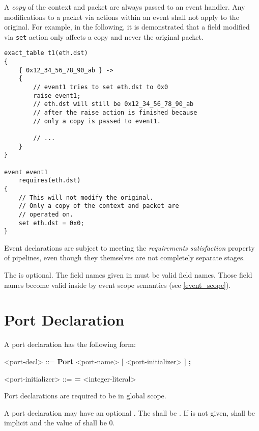 A \textit{copy} of the context  and packet are always passed to an event handler. Any modifications to a packet via actions within an event shall not apply to the original. For example, in the following, it is demonstrated that a field modified via \texttt{set} action only affects a copy and never the original packet.

\begin{minip}
\begin{lstlisting}
exact_table t1(eth.dst)
{
	{ 0x12_34_56_78_90_ab } ->
	{
		// event1 tries to set eth.dst to 0x0
		raise event1;
		// eth.dst will still be 0x12_34_56_78_90_ab
		// after the raise action is finished because
		// only a copy is passed to event1.
		
		// ...
	}
}

event event1
	requires(eth.dst)
{
	// This will not modify the original.
	// Only a copy of the context and packet are
	// operated on.
	set eth.dst = 0x0;
}
\end{lstlisting}
\end{minip}

Event declarations are subject to meeting the \textit{requirements satisfaction} property of pipelines, even though they themselves are not completely separate stages.

The  is optional. The field names given in  must be valid field names. Those field names become valid inside  by event scope semantics (see \ref{event_scope}).

\section{Port Declaration} \label{port_guide}

A port declaration has the following form:

\begin{minip}
\begin{grammar}
<port-decl> ::=
\textbf{Port} <port-name> [ <port-initializer> ] \textbf{;}

<port-initializer> ::= \textbf{=} <integer-literal>
\end{grammar}
\end{minip}

Port declarations are required to be in global scope.

A port declaration may have an optional . The  shall be . If  is not given,  shall be implicit and the value of  shall be 0.

